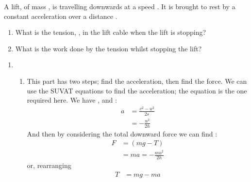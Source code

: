 

\begin{problem}[HE+_Lift]%
{A lift, of  mass , is travelling downwards at a speed . It is brought to rest by a constant acceleration over a distance . 
\begin{enumerate} 
	\item What is the tension, , in the lift cable when the lift is stopping?
	\item What is the work done by the tension whilst stopping the lift?
\end{enumerate}
}
{}
{\begin{enumerate}
\item
\begin{enumerate}
	\item This part has two steps; find the acceleration, then find the force. We can use the SUVAT equations to find the acceleration; the equation  is the one required here. We have ,  and :
\begin{align*} 
a &= \frac{v^{2} - u^{2}}{2s} \\ 
&= -\frac{u^{2}}{2h} 
\end{align*}
And then by considering the total downward force we can find :
\begin{align*} 
F &= (mg - T) \\ 
&= ma = -\frac{mu^{2}}{2h} 
\end{align*}
or, rearranging 
\begin{align*} 
T &= mg - ma \\ 

\end{align*}
\end{enumerate}
\end{enumerate}}
\end{problem}
